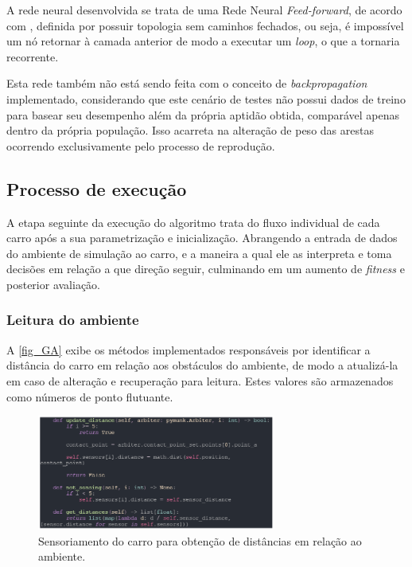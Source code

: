 A rede neural desenvolvida se trata de uma Rede Neural \textit{Feed-forward}, de acordo com , definida
por possuir topologia sem caminhos fechados, ou seja, é impossível um nó retornar à camada anterior de modo a executar um
\textit{loop}, o que a tornaria recorrente. 

Esta rede também não está sendo feita com o conceito de \textit{backpropagation} implementado, considerando que este cenário
de testes não possui dados de treino para basear seu desempenho além da própria aptidão obtida, comparável apenas dentro da própria população.
Isso acarreta na alteração de peso das arestas ocorrendo exclusivamente pelo processo de reprodução.

\subsection{Processo de execução}
A etapa seguinte da execução do algoritmo trata do fluxo individual de cada carro após a sua parametrização e inicialização.
Abrangendo a entrada de dados do ambiente de simulação ao carro, e a maneira a qual ele as interpreta e toma decisões em relação a que direção seguir,
culminando em um aumento de \textit{fitness} e posterior avaliação.

\subsubsection{Leitura do ambiente}
A \autoref{fig_GA} exibe os métodos implementados responsáveis por identificar a distância do carro em relação
aos obstáculos do ambiente, de modo a atualizá-la em caso de alteração e recuperação para leitura. Estes valores
são armazenados como números de ponto flutuante.

\begin{figure}[htb]
        \centering
        \caption{\label{fig_GA}Sensoriamento do carro para obtenção de distâncias em relação ao ambiente.}
        \includegraphics[width=0.7\textwidth]{images/GA.png}
\end{figure}

